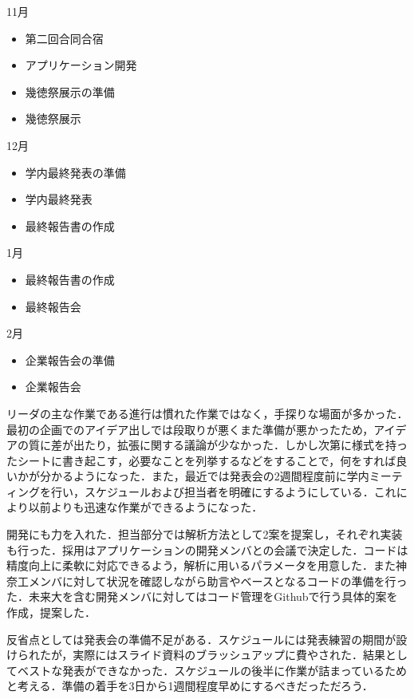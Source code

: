 11月
\begin{itemize}
\item 第二回合同合宿
\item アプリケーション開発
\item 幾徳祭展示の準備
\item 幾徳祭展示
\end{itemize}
12月
\begin{itemize}
\item 学内最終発表の準備
\item 学内最終発表
\item 最終報告書の作成
\end{itemize}
1月
\begin{itemize}
\item 最終報告書の作成
\item 最終報告会
\end{itemize}
2月
\begin{itemize}
\item 企業報告会の準備
\item 企業報告会
\end{itemize}

\par リーダの主な作業である進行は慣れた作業ではなく，手探りな場面が多かった．最初の企画でのアイデア出しでは段取りが悪くまた準備が悪かったため，アイデアの質に差が出たり，拡張に関する議論が少なかった．しかし次第に様式を持ったシートに書き起こす，必要なことを列挙するなどをすることで，何をすれば良いかが分かるようになった．また，最近では発表会の2週間程度前に学内ミーティングを行い，スケジュールおよび担当者を明確にするようにしている．これにより以前よりも迅速な作業ができるようになった．
\par 開発にも力を入れた．担当部分では解析方法として2案を提案し，それぞれ実装も行った．採用はアプリケーションの開発メンバとの会議で決定した．コードは精度向上に柔軟に対応できるよう，解析に用いるパラメータを用意した．また神奈工メンバに対して状況を確認しながら助言やベースとなるコードの準備を行った．未来大を含む開発メンバに対してはコード管理をGithubで行う具体的案を作成，提案した．
\par 反省点としては発表会の準備不足がある．スケジュールには発表練習の期間が設けられたが，実際にはスライド資料のブラッシュアップに費やされた．結果としてベストな発表ができなかった．スケジュールの後半に作業が詰まっているためと考える．準備の着手を3日から1週間程度早めにするべきだっただろう．

